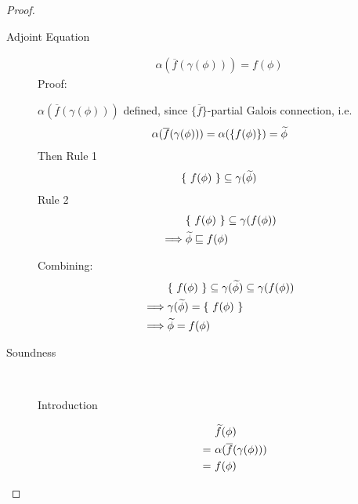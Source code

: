 \begin{proof}~
    \begin{description}
        \item[Adjoint Equation] 
        \begin{align*}
        \alpha(\overline{f}(\gamma(\phi))) = f(\phi)
        \end{align*}
        Proof:
        
        $\alpha(\overline{f}(\gamma(\phi)))$ defined, since $\{ \overline{f} \}$-partial Galois connection, i.e.
        \begin{align*}
        \alpha(\overline{f}(\gamma(\phi))) = \alpha(\{ f(\phi) \}) = \widetilde{\phi}
        \end{align*}
        Then
        Rule 1
        \begin{align*}
        &\{~ f(\phi) ~\} \subseteq \gamma(\widetilde{\phi})\\
        \end{align*}
        Rule 2
        \begin{align*}
        &\{~ f(\phi) ~\} \subseteq \gamma(f(\phi))\\
        \implies
        & \widetilde{\phi} \sqsubseteq f(\phi)
        \end{align*}
        
        Combining:
        \begin{align*}
        &\{~ f(\phi) ~\} \subseteq \gamma(\widetilde{\phi}) \subseteq \gamma(f(\phi))\\
        \implies
        & \gamma(\widetilde{\phi}) = \{~ f(\phi) ~\}\\
        \implies
        & \widetilde{\phi} = f(\phi)
        \end{align*}
        
        \item[Soundness]~
        \begin{description}
            \item[Introduction] 
            \begin{align*}
            &\widetilde{f}(\phi)\\
            =~
            &\alpha(\overline{f}(\gamma(\phi)))\\
            =~ 
            &f(\phi)
            \end{align*}
            

\end{description}
\end{description}
\end{proof}

